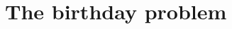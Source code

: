 \documentclass[thesis.tex]{subfiles}
\begin{document}
\chapter{The birthday problem}
\label{sec:birthday_problem}
\end{document}
